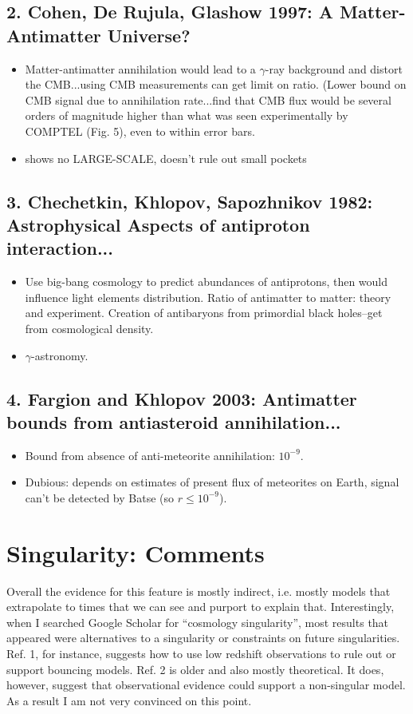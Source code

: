 \documentclass{article}
\begin{document}
\subsection*{2. Cohen, De Rujula, Glashow 1997: A Matter-Antimatter Universe?}
\begin{itemize}
\item Matter-antimatter annihilation would lead to a $\gamma$-ray background and distort the CMB...using CMB measurements can get limit on ratio. (Lower bound on CMB signal due to annihilation rate...find that CMB flux would be several orders of magnitude higher than what was seen experimentally by COMPTEL (Fig. 5), even to within error bars.
\item shows no LARGE-SCALE, doesn't rule out small pockets
\end{itemize}

\subsection*{3. Chechetkin, Khlopov, Sapozhnikov 1982: Astrophysical Aspects of antiproton interaction...}
\begin{itemize}
\item Use big-bang cosmology to predict abundances of antiprotons, then would influence light elements distribution. Ratio of antimatter to matter: theory and experiment. Creation of antibaryons from primordial black holes--get from cosmological density. 
\item $\gamma$-astronomy.
\end{itemize}


\subsection*{4. Fargion and Khlopov 2003: Antimatter bounds from antiasteroid annihilation...}
\begin{itemize}
\item Bound from absence of anti-meteorite annihilation: $10^{-9}$.
\item Dubious: depends on estimates of present flux of meteorites on Earth, signal can't be detected by Batse (so $r\le 10^{-9}$).
\end{itemize}

\newpage
\section{Singularity: Comments}
Overall the evidence for this feature is mostly indirect, i.e. mostly models that extrapolate to times that we can see and purport to explain that. Interestingly, when I searched Google Scholar for ``cosmology singularity'', most results that appeared were alternatives to a singularity or constraints on future singularities. Ref. 1, for instance, suggests how to use low redshift observations to rule out or support bouncing models. Ref. 2 is older and also mostly theoretical. It does, however, suggest that observational evidence could support a non-singular model. As a result I am not very convinced on this point. 
\end{document}
